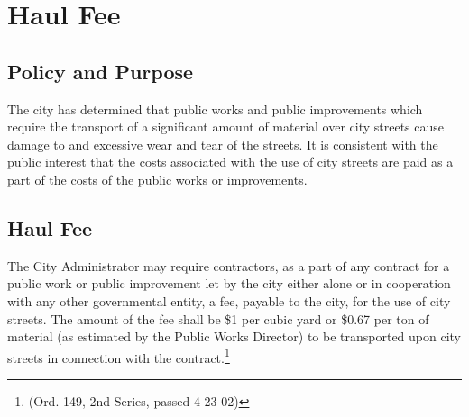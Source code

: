 \section{Haul Fee}
\subsection{Policy and Purpose}
The city has determined that public works and public improvements which require the transport of a significant amount of material over city streets cause damage to and excessive wear and tear of the streets.  It is consistent with the public interest that the costs associated with the use of city streets are paid as a part of the costs of the public works or improvements.
\subsection{Haul Fee}
The City Administrator may require contractors, as a part of any contract for a public work or public improvement let by the city either alone or in cooperation with any other governmental entity, a fee, payable to the city, for the use of city streets.  The amount of the fee shall be \$1 per cubic yard or \$0.67 per ton of material (as estimated by the Public Works Director) to be transported upon city streets in connection with the contract.\footnote{(Ord. 149, 2nd Series, passed 4-23-02)}

\setcounter{section}{98}
